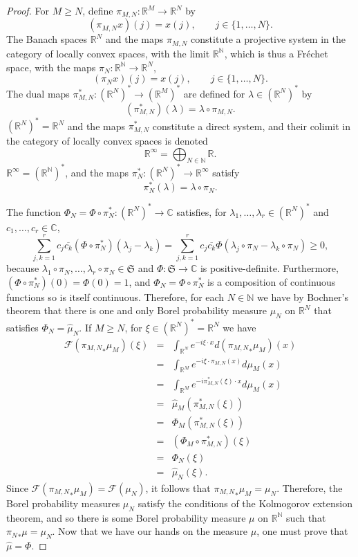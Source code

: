 \documentclass{article}
\theoremstyle{definition}
\theoremstyle{definition}
\begin{document}
\begin{proof}
For $M \geq N$, define $\pi_{M,N}:\mathbb{R}^M \to \mathbb{R}^N$  by
\[
(\pi_{M,N} x)(j) = x(j), \qquad j \in \{1, \ldots, N\}.
\]
 The Banach spaces $\mathbb{R}^N$  and the maps $\pi_{M,N}$ constitute a projective system in the category of locally convex spaces, with 
  the limit $\mathbb{R}^\mathbb{N}$, which is thus a Fr\'echet space,
with the maps
$\pi_N:\mathbb{R}^\mathbb{N} \to \mathbb{R}^N$,
\[
(\pi_N x)(j)=x(j), \qquad j \in \{1,\ldots,N\}.
\]
The dual maps $\pi_{M,N}^*:(\mathbb{R}^N)^* \to (\mathbb{R}^M)^*$ are defined for $\lambda \in (\mathbb{R}^N)^*$ by 
\[
(\pi_{M,N}^*)(\lambda)=\lambda \circ \pi_{M,N}.
\]
$(\mathbb{R}^N)^*=\mathbb{R}^N$ and the maps $\pi_{M,N}^*$ constitute a direct system, and their colimit in the category of locally convex spaces is
denoted
\[
\mathbb{R}^\infty = \bigoplus_{N \in \mathbb{N}} \mathbb{R}.
\]
$\mathbb{R}^\infty = (\mathbb{R}^\mathbb{N})^*$, and
the maps $\pi_N^*:(\mathbb{R}^N)^* \to \mathbb{R}^\infty$ satisfy 
\[
\pi_N^*(\lambda) = \lambda \circ \pi_N.
\]


The function $\Phi_N=\Phi \circ \pi_N^*:(\mathbb{R}^N)^* \to \mathbb{C}$ satisfies, for $\lambda_1,\ldots,\lambda_r \in (\mathbb{R}^N)^*$ and $c_1,\ldots,c_r \in \mathbb{C}$,
\[
\sum_{j,k=1}^r c_j \overline{c_k} (\Phi  \circ \pi_N^*) (\lambda_j-\lambda_k)=\sum_{j,k=1}^r c_j \overline{c_k} \Phi(\lambda_j \circ \pi_N - \lambda_k \circ \pi_N) \geq 0,
\]
because $\lambda_1 \circ \pi_N, \ldots,\lambda_r \circ \pi_N \in \mathfrak{S}$ and $\Phi:\mathfrak{S} \to \mathbb{C}$ is positive-definite.
Furthermore, $(\Phi \circ \pi_N^*)(0) = \Phi(0)=1$, and $\Phi_N=\Phi \circ \pi_N^*$ is a composition of continuous functions so is itself
continuous. Therefore, for each $N \in \mathbb{N}$ we have by Bochner's theorem that there is one and only Borel probability
measure $\mu_N$ on $\mathbb{R}^N$ that satisfies  $\Phi_N = \hat{\mu}_N$. 
If $M \geq N$, for $\xi \in (\mathbb{R}^N)^*=\mathbb{R}^N$ we have
\begin{eqnarray*}
\mathscr{F} ({\pi_{M,N}}_* \mu_M)(\xi)&=&\int_{\mathbb{R}^N} e^{-i\xi\cdot x} d({\pi_{M,N}}_* \mu_M)(x)\\
&=&\int_{\mathbb{R}^M} e^{-i\xi \cdot \pi_{M,N}(x)} d\mu_M(x)\\
&=&\int_{\mathbb{R}^M} e^{-i\pi_{M,N}^*(\xi) \cdot x} d\mu_M(x)\\
&=&\hat{\mu}_M(\pi_{M,N}^*(\xi))\\
&=&\Phi_M(\pi_{M,N}^*(\xi))\\
&=&(\Phi_M \circ \pi_{M,N}^*)(\xi)\\
&=&\Phi_N(\xi)\\
&=&\hat{\mu}_N(\xi).
\end{eqnarray*}
Since $\mathscr{F}({\pi_{M,N}}_* \mu_M)=\mathscr{F}(\mu_N)$, it follows that ${\pi_{M,N}}_* \mu_M=\mu_N$. Therefore, the Borel probability measures $\mu_N$ satisfy
the conditions of the Kolmogorov extension theorem, and so there is some Borel probability measure $\mu$ on $\mathbb{R}^\mathbb{N}$ such that
${\pi_N}_* \mu=\mu_N$.  
Now that we have our hands on the measure $\mu$, one must prove that $\hat{\mu}=\Phi$.



\end{proof}
\end{document}
